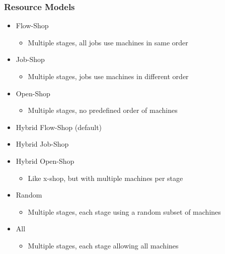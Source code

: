 \begin{frame}
\frametitle{Resource Models}
\begin{itemize}
\item Flow-Shop
\begin{itemize}
\item Multiple stages, all jobs use machines in same order
\end{itemize}

\item Job-Shop
\begin{itemize}
\item Multiple stages, jobs use machines in different order
\end{itemize}

\item Open-Shop
\begin{itemize}
\item Multiple stages, no predefined order of machines
\end{itemize}

\item Hybrid Flow-Shop (default)
\item Hybrid Job-Shop
\item Hybrid Open-Shop
\begin{itemize}
\item Like x-shop, but with multiple machines per stage
\end{itemize}

\item Random
\begin{itemize}
\item Multiple stages, each stage using a random subset of machines
\end{itemize}

\item All
\begin{itemize}
\item Multiple stages, each stage allowing all machines
\end{itemize}

\end{itemize}
\end{frame}



